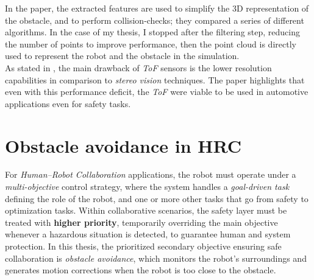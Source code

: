\noindent
In the paper, the extracted features are used to simplify the 3D representation of the obstacle, and to perform collision-checks; they compared a series of different algorithms. In the case of my thesis, I stopped after the filtering step, reducing the number of points to improve performance, then the point cloud is directly used to represent the robot and the obstacle in the simulation.\\
\noindent As stated in \cite{hussmann2008performance}, the main drawback of \textit{ToF} sensors is the lower resolution capabilities in comparison to \textit{stereo vision} techniques. The paper highlights that even with this performance deficit, the \textit{ToF} were viable to be used in automotive applications even for safety tasks.


\section{Obstacle avoidance in HRC}
For \textit{Human--Robot Collaboration} applications, the robot must operate under a \textit{multi-objective} control strategy, where the system handles a \textit{goal-driven task} defining the role of the robot, and one or more other tasks that go from safety to optimization tasks.  
Within collaborative scenarios, the safety layer must be treated with \textbf{higher priority}, temporarily overriding the main objective whenever a hazardous situation is detected, to guarantee human and system protection.  
In this thesis, the prioritized secondary objective ensuring safe collaboration is \textit{obstacle avoidance}, which monitors the robot's surroundings and generates motion corrections when the robot is too close to the obstacle.

